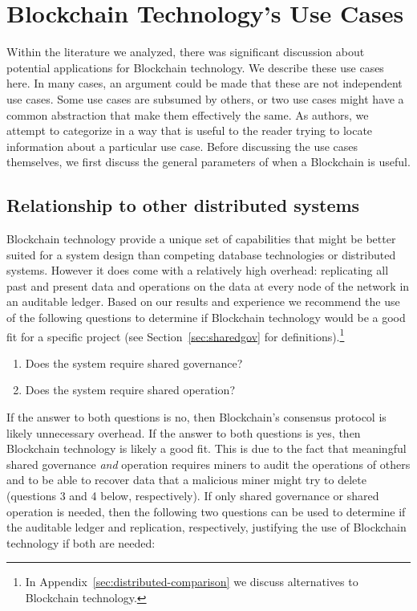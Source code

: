 
\section{Blockchain Technology's Use Cases}
\label{sec:use-cases}

Within the literature we analyzed, there was significant discussion about potential applications for Blockchain technology.
We describe these use cases here.
In many cases, an argument could be made that these are not independent use cases. Some use cases are subsumed by others, or two use cases might have a common abstraction that make them effectively the same.
As authors, we attempt to categorize in a way that is useful to the reader trying to locate information about a particular use case. Before discussing the use cases themselves, we first discuss the general parameters of when a Blockchain is useful. 

\subsection{Relationship to other distributed systems}

Blockchain technology provide a unique set of capabilities that might be better suited for a system design than competing database technologies or distributed systems.
However it does come with a relatively high overhead: replicating all past and present data and operations on the data at every node of the network in an auditable ledger.
Based on our results and experience we recommend the use of the following questions to determine if Blockchain technology would be a good fit for a specific project (see Section~\ref{sec:sharedgov} for definitions).\footnote{In Appendix~\ref{sec:distributed-comparison} we discuss alternatives to Blockchain technology.}

\begin{enumerate}
	\item Does the system require shared governance?
	\item Does the system require shared operation?
\end{enumerate}

If the answer to both questions is no, then Blockchain's consensus protocol is likely unnecessary overhead. If the answer to both questions is yes, then Blockchain technology is likely a good fit. This is due to the fact that meaningful shared governance \emph{and} operation requires miners to audit the operations of others and to be able to recover data that a malicious miner might try to delete (questions 3 and 4 below, respectively). If only shared governance or shared operation is needed, then the following two questions can be used to determine if the auditable ledger and replication, respectively, justifying the use of Blockchain technology if both are needed:

